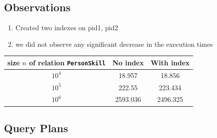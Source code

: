 \documentclass{article}
\begin{document}
    \subsection*{Observations}
    \begin{center}
      \begin{enumerate}
        \item Created two indexes on pid1, pid2
        \item we did not observe any significant decrease in the execution times
      \end{enumerate}
      \vspace*{10pt}
      {\normalsize
        \begin{tabular}{c|c|c}
        size $n$ of relation {\tt PersonSkill} & No index & With index \\ \hline
        $10^4$ & 18.957 & 18.856\\
        $10^5$ & 222.55 &  223.434\\
        $10^6$ & 2593.036 & 2496.325\\
        \end{tabular}
      }
      \end{center}
    \subsection*{Query Plans}
\end{document}
